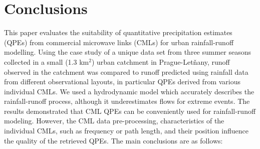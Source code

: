 \documentclass{ctuthesis}\usepackage[]{graphicx}\usepackage[]{color}
\begin{document}
\section{Conclusions}

This paper evaluates the suitability of quantitative precipitation estimates (QPEs) from commercial microwave links (CMLs) for urban rainfall-runoff modelling. Using the case study of a unique data set from three summer seasons collected in a small (1.3 km$^2$) urban catchment in Prague-Letňany, runoff observed in the catchment was compared to runoff predicted using rainfall data from different observational layouts, in particular QPEs derived from various individual CMLs. We used a hydrodynamic model which accurately describes the rainfall-runoff process, although it underestimates flows for extreme events. The results demonstrated that CML QPEs can be conveniently used for rainfall-runoff modeling. However, the CML data pre-processing, characteristics of the individual CMLs, such as frequency or path length, and their position influence the quality of the retrieved QPEs. The main conclusions are as follows:
\end{document}
